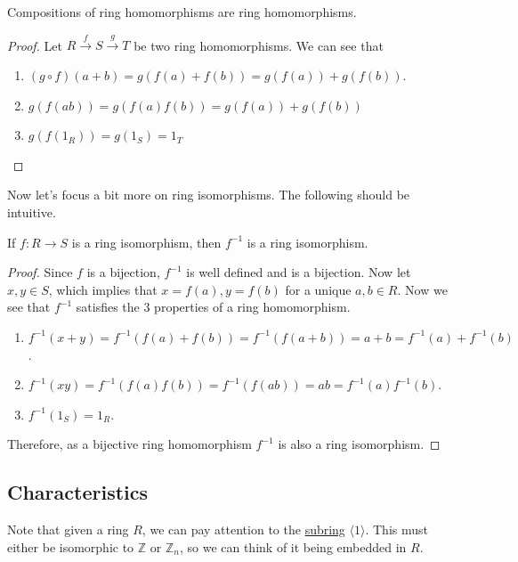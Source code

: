  \begin{theorem}
    \label{thm:compositions-of-ring-homomorphisms}
    Compositions of ring homomorphisms are ring homomorphisms. 
  \end{theorem} 
  \begin{proof}
    Let $R \xrightarrow{f} S \xrightarrow{g} T$ be two ring homomorphisms. We can see that 
    \begin{enumerate}
      \item $(g \circ f)(a + b) = g( f(a) + f(b)) = g(f(a)) + g(f(b))$. 
      \item $g(f(ab)) = g(f(a) f(b)) = g(f(a)) + g(f(b))$ 
      \item $g(f(1_R)) = g(1_S) = 1_T$
    \end{enumerate}
  \end{proof}

  Now let's focus a bit more on ring isomorphisms. The following should be intuitive. 

  \begin{lemma}
    \label{thm:inverse-of-ring-isomorphism-is-an-isomorphism}
    If $f: R \to S$ is a ring isomorphism, then $f^{-1}$ is a ring isomorphism. 
  \end{lemma} 
  \begin{proof}
    Since $f$ is a bijection, $f^{-1}$ is well defined and is a bijection. Now let $x, y \in S$, which implies that $x = f(a), y = f(b)$ for a unique $a, b \in R$. Now we see that $f^{-1}$ satisfies the 3 properties of a ring homomorphism. 
    \begin{enumerate}
      \item $f^{-1} (x + y) = f^{-1} (f(a) + f(b)) = f^{-1}(f(a + b)) = a + b = f^{-1}(a) + f^{-1} (b)$. 
      \item $f^{-1} (x y) = f^{-1} (f(a) f(b)) = f^{-1}(f(a b)) = a b = f^{-1}(a) f^{-1} (b)$. 
      \item $f^{-1}(1_S) = 1_R$. 
    \end{enumerate}
    Therefore, as a bijective ring homomorphism $f^{-1}$ is also a ring isomorphism. 
  \end{proof}

\subsection{Characteristics}

  Note that given a ring $R$, we can pay attention to the \hyperref[def:subring]{subring} $\langle 1 \rangle$. This must either be isomorphic to $\mathbb{Z}$ or $\mathbb{Z}_n$, so we can think of it being embedded in $R$. 
  
